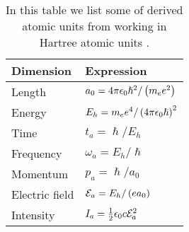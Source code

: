         \begin{table}
            \centering
            \caption{In this table we list some of derived atomic units from
            working in Hartree atomic units \cite{hartree_1928,
            joachain2012atoms}.}
            \renewcommand{\arraystretch}{1.3}
            \begin{tabular}{@{}ll@{}}
                \toprule
                Dimension & Expression
                \\
                \midrule
                Length
                &
                $a_0 = 4\pi\epsilon_0\hslash^2/\left( m_e e^2 \right)$
                \\
                Energy
                &
                $E_h = m_e e^4/\left( 4\pi \epsilon_0 \hslash \right)^2$
                \\
                Time
                &
                $t_a = \hslash/E_h$
                \\
                Frequency
                &
                $\omega_a = E_h/\hslash$
                \\
                Momentum
                &
                $p_a = \hslash/a_0$
                \\
                Electric field
                &
                $\mathcal{E}_a = E_h/\left( e a_0 \right)$
                \\
                Intensity
                &
                $I_a = \frac{1}{2}\epsilon_0 c \mathcal{E}^2_a$
                \\
                \bottomrule
            \end{tabular}
            \label{tab:atomic-units}
        \end{table}

